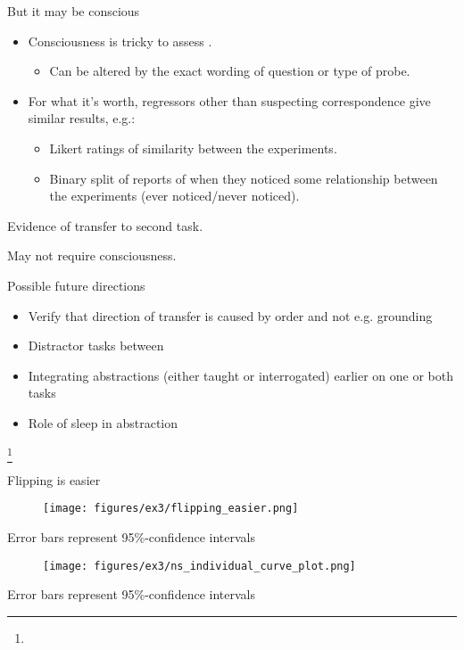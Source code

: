 \documentclass{beamer}
\newcommand\blfootnote[1]{%
  \begingroup
  \renewcommand\thefootnote{}\footnote{#1}%
  \addtocounter{footnote}{-1}%
  \endgroup
}
\begin{document}
\begin{frame}{But it may be conscious}
\begin{itemize}
\item Consciousness is tricky to assess \citep{Newell2014}.
    \begin{itemize}
    \item<2-> Can be altered by the exact wording of question or type of probe.
    \end{itemize}
\item<3-> For what it's worth, regressors other than suspecting correspondence give similar results, e.g.:
    \begin{itemize}
    \item<4-> Likert ratings of similarity between the experiments.
    \item<5-> Binary split of reports of when they noticed some relationship between the experiments (ever noticed/never noticed).
    \end{itemize}
\end{itemize}
\end{frame}

\begin{frame}[standout]
Evidence of transfer to second task. \par
{} {
May not require consciousness.
}
\end{frame}

\begin{frame}{Possible future directions}
\begin{itemize}
\item Verify that direction of transfer is caused by order and not e.g. grounding
\item Distractor tasks between
\item Integrating abstractions (either taught or interrogated) earlier on one or both tasks
\item Role of sleep in abstraction
\end{itemize}
\end{frame}

\begin{frame}[allowframebreaks]

\blfootnote{}
\end{frame}

\appendix

\begin{frame}{Flipping is easier}
\begin{figure}
\centering
\texttt{[image: figures/ex3/flipping\_easier.png]}
\end{figure}
{\scriptsize Error bars represent 95\%-confidence intervals}
\end{frame}

\begin{frame}
\begin{figure}
\centering
\texttt{[image: figures/ex3/ns\_individual\_curve\_plot.png]}
\end{figure}
{\scriptsize Error bars represent 95\%-confidence intervals}
\end{frame}
\end{document}
